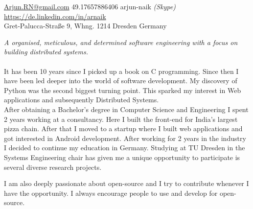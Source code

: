 \documentclass[10pt,a4paper]{article}
\begin{document}
\sloppy  %


\nobreakvspace{0.3em}  %

\noindent\href{mailto:Arjun.RN@gmail.com}{Arjun.RN\mbox{}@\mbox{}gmail.com}\sbull
\textsmaller{+}49.17657886406
\sbull arjun-naik \emph{(Skype)}
\\
\sbull
\href{https://de.linkedin.com/in/arnaik}{https://de.linkedin.com/in/arnaik}
\\
Gret-Palucca-Stra{\ss}e 9, Whng. 1214\sbull
Dresden\sbull
Germany

\spacedhrule{0.9em}{-0.4em}  %


\vspace{-1.3em}  %
\begin{multicols}{2}  %
\noindent \emph{A organised, meticulous, and determined software engineering with a focus on building distributed systems.}
\\
\\
It has been 10 years since I picked up a book on C programming. Since then I have been led deeper into the world of software development. My discovery of Python was the second biggest turning point. This sparked my interest in Web applications and subsequently Distributed Systems. 
\\
After obtaining a Bachelor's degree in Computer Science and Engineering I spent 2 years working at a consultancy. Here I built the front-end for India's largest pizza chain. After that I moved to a startup where I built web applications and got interested in Android development. After working for 2 years in the industry I decided to continue my education in Germany. Studying at TU Dresden in the Systems Engineering chair has given me a unique opportunity to participate is several diverse research projects.

I am also deeply passionate about open-source and I try to contribute whenever I have the opportunity. I always encourage people to use and develop for open-source.

\\

\end{multicols}
\end{document}
